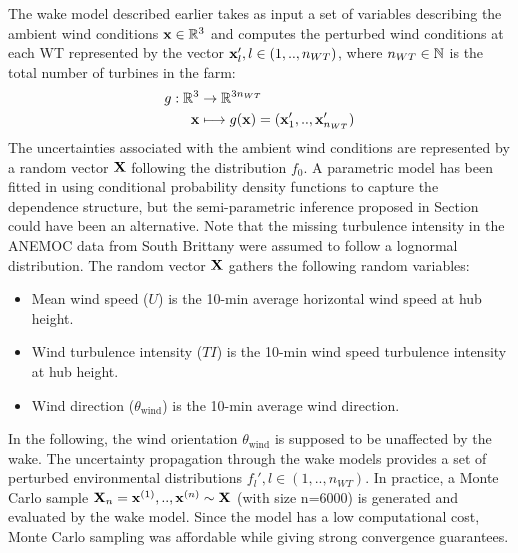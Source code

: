 The wake model described earlier takes as input a set of variables describing the ambient wind conditions ${\bf x} \in \mathbb{R}^3$ and computes the perturbed wind conditions at each WT represented by the vector ${\bf x} _l', l \in (1,..,n_{WT})$, where $n_{WT} \in \mathbb{N}$ is the total number of turbines in the farm:
\begin{align}
    g:\mathbb{R}^3 &\rightarrow \mathbb{R}^{3 n_{WT}} \\
    {\bf x} &\longmapsto g({\bf x}) = ({\bf x}_1',..,{\bf x}_{n_{WT}}')
\end{align}
The uncertainties associated with the ambient wind conditions are represented by a random vector ${\bf X}$ following the distribution $f_0$. 
A parametric model has been fitted in \cite{vanem_fekhari_2023} using conditional probability density functions to capture the dependence structure, 
but the semi-parametric inference proposed in Section~ could have been an alternative. 
Note that the missing turbulence intensity in the ANEMOC data from South Brittany were assumed to follow a lognormal distribution.   
The random vector ${\bf X}$ gathers the following random variables:
\begin{itemize}
    \item Mean wind speed ($U$) is the 10-min average horizontal wind speed at hub height.
    \item Wind turbulence intensity ($TI$) is the 10-min wind speed turbulence intensity at hub height.
    \item Wind direction ($\theta_{\mathrm{wind}}$) is the 10-min average wind direction.
\end{itemize}

In the following, the wind orientation $\theta_{\mathrm{wind}}$ is supposed to be unaffected by the wake. 
The uncertainty propagation through the wake models provides a set of perturbed environmental distributions $f_l', l \in (1,..,n_{WT})$. 
In practice, a Monte Carlo sample ${\bf X}_n={{\bf x}^{(1)},..,{\bf x}^{(n)}} \sim {\bf X}$ (with size n=6000) is generated and evaluated by the wake model. 
Since the model has a low computational cost, Monte Carlo sampling was affordable while giving strong convergence guarantees. 

